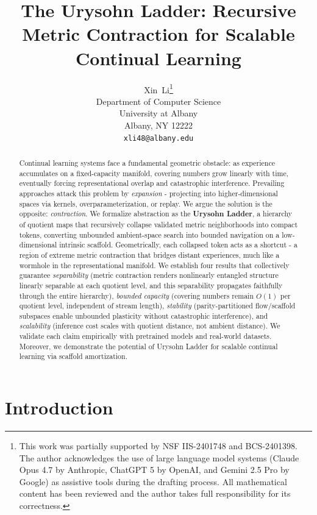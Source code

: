 \documentclass{article}
\title{The Urysohn Ladder: Recursive Metric Contraction for Scalable Continual Learning}
\author{%
  Xin~Li\thanks{This work was partially supported by NSF IIS-2401748 and BCS-2401398.
  The author acknowledges the use of large language model systems (Claude
  Opus 4.7 by Anthropic, ChatGPT 5 by OpenAI, and Gemini 2.5 Pro by Google) as
  assistive tools during the drafting process. All mathematical content has
  been reviewed and the author takes full responsibility for its correctness.} \\
  Department of Computer Science\\
  University at Albany\\
  Albany, NY 12222 \\
  \texttt{xli48@albany.edu} \\
  }
\begin{document}

\maketitle


 
\begin{abstract}
Continual learning systems face a fundamental geometric obstacle: as experience accumulates on a fixed-capacity manifold, covering numbers grow linearly with time, eventually forcing representational overlap and catastrophic interference. Prevailing approaches attack this problem by \emph{expansion} - projecting into higher-dimensional spaces via kernels, overparameterization, or replay. We argue the solution is the opposite: \emph{contraction}. We formalize abstraction as the \textbf{Urysohn Ladder}, a hierarchy of quotient maps that recursively collapse validated metric neighborhoods into compact tokens, converting unbounded ambient-space search into bounded navigation on a low-dimensional intrinsic scaffold. Geometrically, each collapsed token acts as a shortcut - a region of extreme metric contraction that bridges distant experiences, much like a wormhole in the representational manifold. We establish four results that collectively guarantee \emph{separability} (metric contraction renders nonlinearly entangled structure linearly separable at each quotient level, and this separability propagates faithfully through the entire hierarchy), \emph{bounded capacity} (covering numbers remain $O(1)$ per quotient level, independent of stream length), \emph{stability} (parity-partitioned flow/scaffold subspaces enable unbounded plasticity without catastrophic interference), and \emph{scalability} (inference cost scales with quotient distance, not ambient distance). We validate each claim empirically with pretrained models and real-world datasets. Moreover, we demonstrate the potential of Urysohn Ladder for scalable continual learning via scaffold amortization.
\end{abstract}

\section{Introduction}
\end{document}
